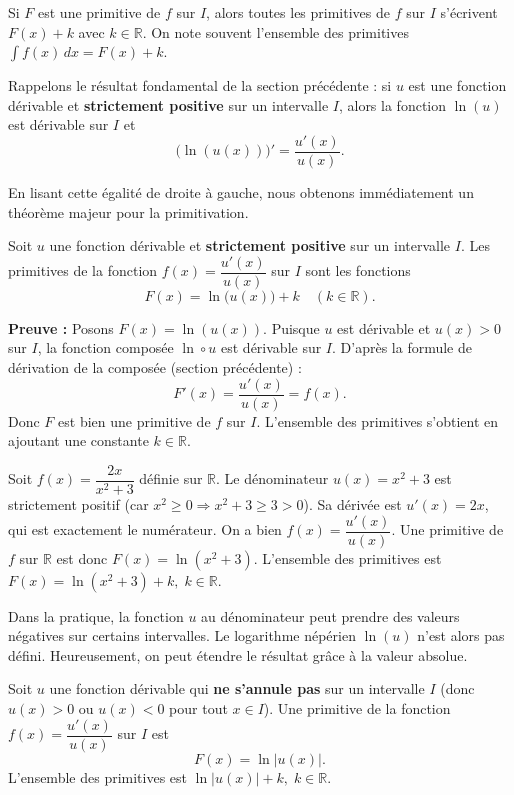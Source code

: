 \documentclass[11pt]{article}
\newcounter{popsec}
\newcounter{popsub}
\newcommand{\courssub}[1]{%
  \stepcounter{popsub}%
  \par\vspace{9pt}\noindent{\popxbold\fontsize{11.5}{13}\selectfont\color{popink}{\color{poporange}\thepopsec.\thepopsub}\hspace{6pt}#1}\par\nopagebreak\vspace{4pt}
}
\begin{document}
Si $F$ est une primitive de $f$ sur $I$, alors toutes les primitives de $f$ sur $I$ s'écrivent $F(x) + k$ avec $k \in \mathbb{R}$. On note souvent l'ensemble des primitives $\int f(x) \, dx = F(x) + k$.

Rappelons le résultat fondamental de la section précédente : si $u$ est une fonction dérivable et \textbf{strictement positive} sur un intervalle $I$, alors la fonction $\ln(u)$ est dérivable sur $I$ et
\[
\bigl(\ln(u(x))\bigr)' = \frac{u'(x)}{u(x)}.
\]

En lisant cette égalité de droite à gauche, nous obtenons immédiatement un théorème majeur pour la primitivation.

\begin{propriete}
Soit $u$ une fonction dérivable et \textbf{strictement positive} sur un intervalle $I$.
Les primitives de la fonction $f(x) = \dfrac{u'(x)}{u(x)}$ sur $I$ sont les fonctions
\[
F(x) = \ln\bigl(u(x)\bigr) + k \quad (k \in \mathbb{R}).
\]

\textbf{Preuve :} Posons $F(x) = \ln(u(x))$. Puisque $u$ est dérivable et $u(x) > 0$ sur $I$, la fonction composée $\ln \circ u$ est dérivable sur $I$. D'après la formule de dérivation de la composée (section précédente) :
\[
F'(x) = \frac{u'(x)}{u(x)} = f(x).
\]
Donc $F$ est bien une primitive de $f$ sur $I$. L'ensemble des primitives s'obtient en ajoutant une constante $k \in \mathbb{R}$.
\end{propriete}

\begin{exemplebox}
Soit $f(x) = \dfrac{2x}{x^2 + 3}$ définie sur $\mathbb{R}$.
Le dénominateur $u(x) = x^2 + 3$ est strictement positif (car $x^2 \ge 0 \Rightarrow x^2+3 \ge 3 > 0$).
Sa dérivée est $u'(x) = 2x$, qui est exactement le numérateur.
On a bien $f(x) = \dfrac{u'(x)}{u(x)}$.
Une primitive de $f$ sur $\mathbb{R}$ est donc $F(x) = \ln(x^2 + 3)$.
L'ensemble des primitives est $F(x) = \ln(x^2 + 3) + k,\; k \in \mathbb{R}$.
\end{exemplebox}

\courssub{Cas général : la valeur absolue}

Dans la pratique, la fonction $u$ au dénominateur peut prendre des valeurs négatives sur certains intervalles. Le logarithme népérien $\ln(u)$ n'est alors pas défini. Heureusement, on peut étendre le résultat grâce à la valeur absolue.

\begin{propriete}
Soit $u$ une fonction dérivable qui \textbf{ne s'annule pas} sur un intervalle $I$ (donc $u(x) > 0$ ou $u(x) < 0$ pour tout $x \in I$).
Une primitive de la fonction $f(x) = \dfrac{u'(x)}{u(x)}$ sur $I$ est
\[
F(x) = \ln\bigl|u(x)\bigr|.
\]
L'ensemble des primitives est $\ln|u(x)| + k,\; k \in \mathbb{R}$.
\end{propriete}
\end{document}
